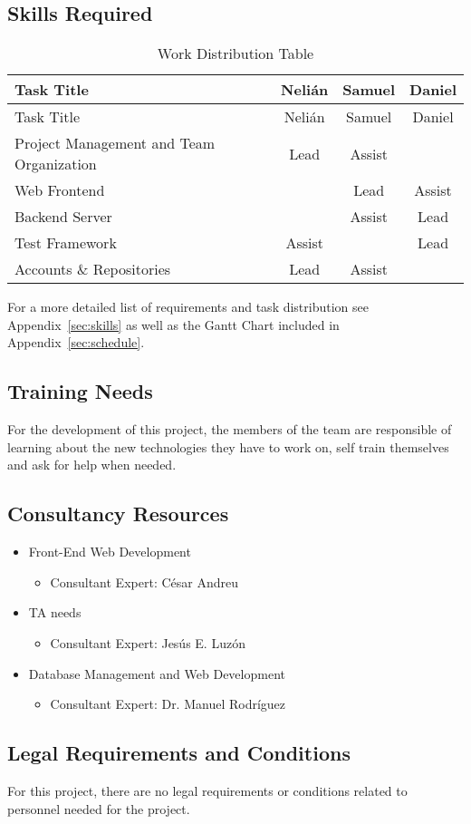 
\subsection{Skills Required}
\begin{center}
\setlength{\extrarowheight}{1.5pt}
  \begin{longtable}{|m{3.25in}|c|c|c|}
 \caption{Work Distribution Table} \\
   \hline
  
  \centering Task Title & Nelián & Samuel & Daniel \\
  \hline \hline \endfirsthead
  
     \hline

	\centering Task Title & Nelián & Samuel & Daniel \\  
	\hline \hline \endhead
  
  \endfoot  
  
  Project Management and Team Organization & Lead & Assist & \\ \hline
  Web Frontend & & Lead & Assist \\ \hline
  Backend Server & & Assist & Lead \\ \hline
  Test Framework & Assist & & Lead \\ \hline
  Accounts \& Repositories & Lead & Assist & \\ \hline
   \end{longtable}
\end{center}

For a more detailed list of requirements and task distribution see Appendix~\ref{sec:skills} as well as the Gantt Chart included in Appendix~\ref{sec:schedule}.

\subsection{Training Needs}
For the development of this project, the members of the team are responsible of learning about the new technologies they have to work on, self train themselves and ask for help when needed.  

\subsection{Consultancy Resources}
\begin{itemize}
\item Front-End Web Development
\begin{itemize}
\item Consultant Expert: César Andreu
\end{itemize}
\item TA needs
\begin{itemize}
\item Consultant Expert: Jesús E. Luzón
\end{itemize}
\item Database Management and Web Development
\begin{itemize}
\item Consultant Expert: Dr. Manuel Rodríguez
\end{itemize}
\end{itemize}

\subsection{Legal Requirements and Conditions}
For this project, there are no legal requirements or conditions related to personnel needed for the project.